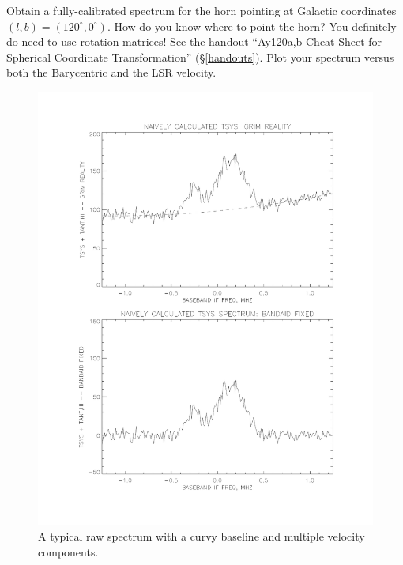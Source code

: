 \documentclass[12pt,preprint]{aastex}
\begin{document}
Obtain a fully-calibrated spectrum for the horn pointing at Galactic
coordinates $(l,b)=(120^\circ, 0^\circ)$. How do you know where to point
the horn? You definitely do need to use rotation matrices!  See the
handout ``Ay120a,b Cheat-Sheet for Spherical Coordinate Transformation''
(\S \ref{handouts}). Plot your spectrum versus both the Barycentric and
the LSR velocity. 

\begin{figure}[h!]
\begin{center}
%       
\includegraphics[scale=0.5]{bmp_cal1.pdf}
\end{center}
\vspace{-0.3in}
\caption{\footnotesize A typical raw spectrum with a curvy baseline and
  multiple velocity components. \label{rawspect}}
\end{figure}
\end{document}
